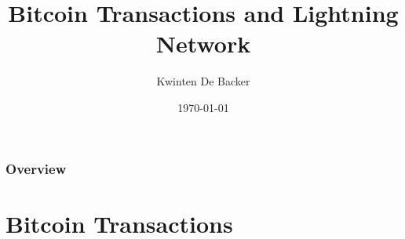 \documentclass{beamer}
\title[Lightning Network]{Bitcoin Transactions and Lightning Network} %
\author{Kwinten De Backer} %
\date{\today} %
\begin{document}
\begin{frame}
\titlepage %
\end{frame}

\begin{frame}
\frametitle{Overview} %
\tableofcontents %
\end{frame}


\section{Bitcoin Transactions} %
\end{document}

